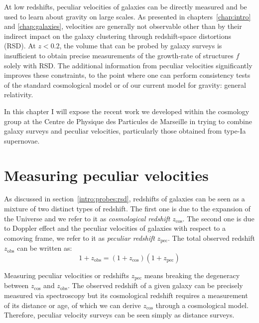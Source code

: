 \chaptertoc{}

\vspace{1em}


At low redshifts, peculiar velocities of galaxies can be directly measured 
and be used to learn about gravity on large scales. 
As presented in chapters~\ref{chap:intro} and \ref{chap:galaxies}, velocities 
are generally not observable other than by their indirect impact on the 
galaxy clustering through redshift-space distortions (RSD).
At $z<0.2$, the volume that can be probed by galaxy surveys is insufficient to obtain 
precise measurements of the growth-rate of structures $f$ solely with RSD. 
The additional information from peculiar velocities
significantly improves these constraints, to the point where one 
can perform consistency tests of the standard cosmological model or of our current 
model for gravity: general relativity. 

In this chapter I will expose the recent work we developed within the 
cosmology group at the Centre de Physique des Particules de Marseille 
in trying to combine galaxy surveys and peculiar velocities, 
particularly those obtained from type-Ia supernovae.




\section{Measuring peculiar velocities}
\label{velocities:measuring}

As discussed in section~\ref{intro:probes:rsd}, 
redshifts of galaxies can be seen as a mixture of two distinct types of redshift. 
The first one is due to the expansion of the Universe and we refer to it as 
\emph{cosmological redshift} $z_\text{cos}$. The second one is due to Doppler effect and the peculiar 
velocities of galaxies with respect to a comoving frame, we refer to it as \emph{peculiar redshift} $z_\text{pec}$.
The total observed redshift $z_\text{obs}$ can be written as: 
\begin{equation}
    1+ z_\text{obs} = (1+z_\text{cos})(1+z_\text{pec})
\end{equation}

Measuring peculiar velocities or redshifts $z_\text{pec}$ means 
breaking the degeneracy between $z_\text{cos}$ and $z_\text{obs}$. 
The observed redshift of a given galaxy can be precisely measured via spectroscopy 
but its cosmological redshift requires a measurement of its distance or age, 
of which we can derive $z_\text{cos}$ through a cosmological model.
Therefore, peculiar velocity surveys can be seen simply as distance surveys.

